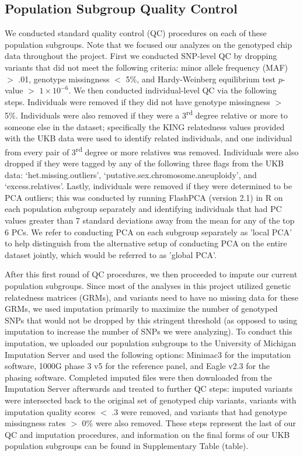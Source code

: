 \documentclass[12pt,a4paper]{article}
\begin{document}
\subsection{Population Subgroup Quality Control}

We conducted standard quality control (QC) procedures on each of these population subgroups. Note that we focused our analyzes on the genotyped chip data throughout the project. First we conducted SNP-level QC by dropping variants that did not meet the following criteria:  minor allele frequency (MAF) $>$ .01, genotype missingness $<$ 5\%, and Hardy-Weinberg equilibrium test $p$-value $>$ $1\times10^{-6}$. We then conducted individual-level QC via the following steps. Individuals were removed if they did not have genotype missingness $>$ 5\%. Individuals were also removed if they were a 3\textsuperscript{rd} degree relative or more to someone else in the dataset; specifically the KING relatedness values provided with the UKB data were used to identify related individuals, and one individual from every pair of 3\textsuperscript{rd} degree or more relatives was removed. Individuals were also dropped if they were tagged by any of the following three flags from the UKB data: `het.missing.outliers', `putative.sex.chromosome.aneuploidy', and `excess.relatives'. Lastly, individuals were removed if they were determined to be PCA outliers; this was conducted by running FlashPCA (version 2.1) \citep{Abraham2017} in R on each population subgroup separately and identifying individuals that had PC values greater than 7 standard deviations away from the mean for any of the top 6 PCs. We refer to conducting PCA on each subgroup separately as 'local PCA' to help distinguish from the alternative setup of conducting PCA on the entire dataset jointly, which would be referred to as 'global PCA'. 

After this first round of QC procedures, we then proceeded to impute our current population subgroups. Since most of the analyses in this project utilized genetic relatedness matrices (GRMs), and variants need to have no missing data for these GRMs, we used imputation primarily to maximize the number of genotyped SNPs that would not be dropped by this stringent threshold (as opposed to using imputation to increase the number of SNPs we were analyzing). To conduct this imputation, we uploaded our population subgroups to the University of Michigan Imputation Server \citep{Das2016} and used the following options: Minimac3 for the imputation software, 1000G phase 3 v5 for the reference panel, and Eagle v2.3 for the phasing software. Completed imputed files were then downloaded from the Imputation Server afterwards and treated to further QC steps: imputed variants were intersected back to the original set of genotyped chip variants, variants with imputation quality scores $<$ .3 were removed, and variants that had genotype missingness rates $>$ 0\% were also removed. These steps represent the last of our QC and imputation procedures, and information on the final forms of our UKB population subgroups can be found in Supplementary Table (table).
\end{document}

